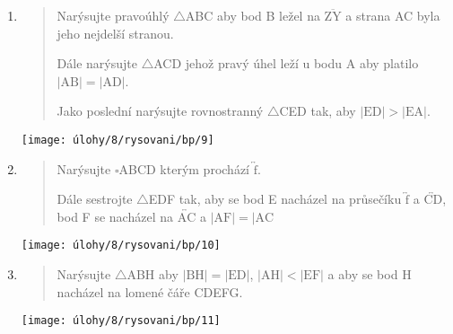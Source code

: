 \begin{enumerate}
\begin{minipage}[t]{\linewidth}
    \end{minipage}

    \item
    \begin{minipage}[t]{\linewidth}
        \begin{quote}
            Narýsujte pravoúhlý $\triangle$ABC aby bod B ležel na $\overline{\text{ZY}}$ a strana AC byla jeho nejdelší stranou.

            Dále narýsujte $\triangle$ACD jehož pravý úhel leží u bodu A aby platilo $\lvert \text{AB} \rvert = \lvert \text{AD} \rvert$.

            Jako poslední narýsujte rovnostranný $\triangle$CED tak, aby $\lvert \text{ED} \rvert > \lvert \text{EA} \rvert$.
        \end{quote}
        \centering
        \texttt{[image: úlohy/8/rysovani/bp/9]}

    \end{minipage}

    \item
    \begin{minipage}[t]{\linewidth}
        \begin{quote}
            Narýsujte $\square$ABCD kterým prochází $\overleftrightarrow{\text{f}}$.

            Dále sestrojte $\triangle$EDF tak, aby se bod E nacházel na průsečíku $\overleftrightarrow{\text{f}}$ a $\overleftrightarrow{\text{CD}}$, bod F se nacházel na $\overleftrightarrow{\text{AC}}$ a $\lvert \text{AF} \rvert = \lvert \text{AC}$
        \end{quote}
        \centering
        \texttt{[image: úlohy/8/rysovani/bp/10]}

    \end{minipage}

    \item
    \begin{minipage}[t]{\linewidth}
        \begin{quote}
            Narýsujte $\triangle$ABH aby $\lvert \text{BH} \rvert = \lvert \text{ED} \rvert$, $\lvert \text{AH} \rvert < \lvert \text{EF} \rvert$ a aby se bod H nacházel na lomené čáře CDEFG\@.
        \end{quote}
        \centering
        \texttt{[image: úlohy/8/rysovani/bp/11]}

    \end{minipage}
\end{enumerate}


